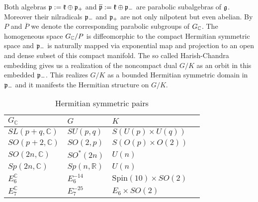 Both algebras $\mathfrak{p} := \mathfrak{k}\oplus \mathfrak{p}_+$ and $\overline{\mathfrak{p}} := \mathfrak{k}\oplus\mathfrak{p}_-$ are parabolic subalgebras of $\mathfrak{g}$. Moreover their nilradicals $\mathfrak{p}_-$ and $\mathfrak{p}_+$ are not only nilpotent but even abelian. By $P$ and $\overline{P}$ we denote the corresponding parabolic subgroups of $G_{\mathbb{C}}$. The homogeneous space $G_{\mathbb{C}}/P$ is diffeomorphic to the compact Hermitian symmetric space and $\mathfrak{p}_-$ is naturally mapped via exponential map and projection to an open and dense subset of this compact manifold. The so called Harish-Chandra embedding gives us a realization of the noncompact dual $G/K$ as an orbit in this embedded $\mathfrak{p}_-$. This realizes $G/K$ as a bounded Hermitian symmetric domain in $\mathfrak{p}_-$ and it manifests the Hermitian structure on $G/K$.

\begin{table}[H]
\begin{center}%
\begin{tabular}{llll}
$G_\mathbb{C}$ & {\centering $G$ }&  $K$\\\hline
$SL(p+q,\mathbb{C})$ & $SU(p,q)$ &$S(U(p)\times U(q))$\\
$SO(p+2,\mathbb{C})$ &  $SO(2,p)$ & $S(O(p)\times O(2))$\\
$SO(2n,\mathbb{C})$ &   $SO^*(2n)$ & $U(n)$\\
$Sp(2n,\mathbb{C})$ &   $Sp(n,\mathbb{R})$ & $U(n)$\\
$E_6^\mathbb{C}$ &   $E_6^{-14}$& $\mathrm{Spin}(10)\times SO(2)$\\
$E_7^\mathbb{C}$ &  $E_7^{-25} $ & $E_6\times SO(2)$
\end{tabular}\caption{Hermitian symmetric pairs \label{fig:herm_pairs}}
\end{center}
\end{table}

